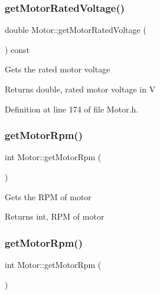\subsubsection{\texorpdfstring{get\+Motor\+Rated\+Voltage()}{getMotorRatedVoltage()}\hspace{0.1cm}{\footnotesize\ttfamily [3/3]}}
{\footnotesize\ttfamily double Motor\+::get\+Motor\+Rated\+Voltage (\begin{DoxyParamCaption}{ }\end{DoxyParamCaption}) const\hspace{0.3cm}{\ttfamily [inline]}}

Gets the rated motor voltage

\begin{DoxyReturn}{Returns}
double, rated motor voltage in V 
\end{DoxyReturn}


Definition at line 174 of file Motor.\+h.

\mbox{\label{class_motor_a13826c93b894d699478e34a98ffb35ab}} 
\subsubsection{\texorpdfstring{get\+Motor\+Rpm()}{getMotorRpm()}\hspace{0.1cm}{\footnotesize\ttfamily [1/3]}}
{\footnotesize\ttfamily int Motor\+::get\+Motor\+Rpm (\begin{DoxyParamCaption}{ }\end{DoxyParamCaption})}

Gets the R\+PM of motor

\begin{DoxyReturn}{Returns}
int, R\+PM of motor 
\end{DoxyReturn}
\mbox{\label{class_motor_a13826c93b894d699478e34a98ffb35ab}} 
\subsubsection{\texorpdfstring{get\+Motor\+Rpm()}{getMotorRpm()}\hspace{0.1cm}{\footnotesize\ttfamily [2/3]}}
{\footnotesize\ttfamily int Motor\+::get\+Motor\+Rpm (\begin{DoxyParamCaption}{ }\end{DoxyParamCaption})}

